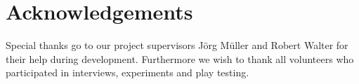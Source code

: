 \documentclass{chi-ext}
\begin{document}
\section{Acknowledgements}
Special thanks go to our project supervisors J\"org M\"uller and Robert Walter for their help during development. Furthermore we wish to thank all volunteers who participated in interviews, experiments and play testing.
%
%
\end{document}

